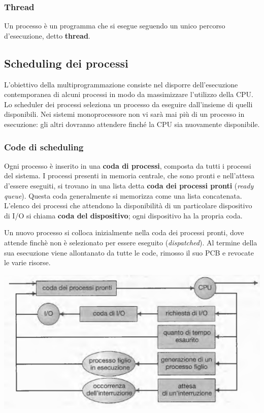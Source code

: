\documentclass[11pt,a4paper]{article}
\begin{document}
\subsubsection{Thread}
Un processo è un programma che si esegue seguendo un unico percorso d'esecuzione, detto \textbf{thread}.

\subsection{Scheduling dei processi}
L'obiettivo della multiprogrammazione consiste nel disporre dell'esecuzione contemporanea
di alcuni processi in modo da massimizzare l'utilizzo della CPU. Lo scheduler dei processi seleziona un processo da eseguire dall'insieme di
quelli disponibili. Nei sistemi monoprocessore non vi sarà mai più di un processo in esecu­zione: gli altri dovranno attendere finché la CPU sia nuovamente disponibile.

\subsubsection{Code di scheduling}
Ogni processo è inserito in una \textbf{coda di processi}, composta da tutti i processi del sistema. I
processi presenti in memoria centrale, che sono pronti e nell'attesa d'essere eseguiti, si tro­vano in una lista detta \textbf{coda dei processi pronti} (\emph{ready queue}). Questa coda generalmente si
memorizza come una lista concatenata.
L'elenco dei processi che attendono la disponibilità di un particolare dispositivo di I/O si chiama
\textbf{coda del dispositivo}; ogni dispositivo ha la propria coda.

Un nuovo processo si colloca inizialmente nella coda dei processi pronti, dove attende
finchè non è selezionato per essere eseguito (\emph{dispatched}). Al termine della sua esecuzione viene allontanato da tutte le code, rimosso il suo PCB e revocate le varie ri­sorse.
\begin{center}
  \includegraphics[scale=0.7]{img/0007.png}
\end{center}
\end{document}
